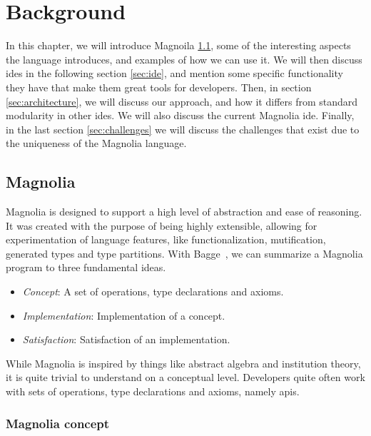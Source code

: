 \chapter{Background} \label{cha:background}

In this chapter, we will introduce Magnoila \ref{sec:magnolia}, some of the
interesting aspects the language introduces, and examples of how we can use it.
We will then discuss \gls*{ide}s in the following section \ref{sec:ide}, and
mention some specific functionality they have that make them great tools for
developers. Then, in section \ref{sec:architecture}, we will discuss our
approach, and how it differs from standard modularity in other \gls*{ide}s. We
will also discuss the current Magnolia \gls*{ide}. Finally, in the last section
\ref{sec:challenges} we will discuss the challenges that exist due to the
uniqueness of the Magnolia language.


\section{Magnolia} \label{sec:magnolia}

Magnolia is designed to support a high level of abstraction and ease of
reasoning. It was created with the purpose of being highly extensible,
allowing for experimentation of language features, like functionalization,
mutification, generated types and type partitions. With
Bagge~\cite{baggeThesis}, we can summarize a Magnolia program to three
fundamental ideas.

\begin{itemize}
  \item \textit{Concept}: A set of operations, type declarations and axioms.
  \item \textit{Implementation}: Implementation of a concept.
  \item \textit{Satisfaction}: Satisfaction of an implementation.
\end{itemize}

While Magnolia is inspired by things like abstract algebra and institution
theory, it is quite trivial to understand on a conceptual level. Developers quite
often work with sets of operations, type declarations and axioms, namely
\gls*{api}s.

\subsection{Magnolia concept}

